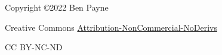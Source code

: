 Copyright \copyright 2022 Ben Payne

Creative Commons \href{https://creativecommons.org/licenses/by-nc-nd/4.0/}{Attribution-NonCommercial-NoDerivs}

CC BY-NC-ND
